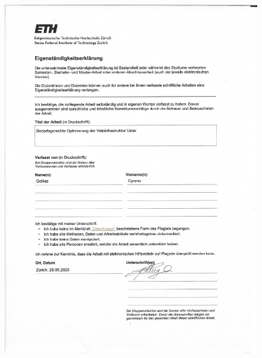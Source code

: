 



{}



\cleardoublepage

\begin{figure}[h!]
	\centering
	\includegraphics[width=\textwidth]{content/f-00-02-a-Declaration}
\end{figure}


\cleardoublepage

